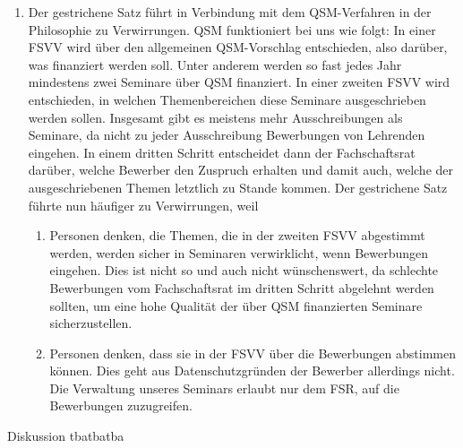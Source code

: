{\begin{enumerate}
\begin{enumerate}
                    \item Der gestrichene Satz führt in Verbindung mit dem QSM-Verfahren in der Philosophie zu Verwirrungen. QSM funktioniert bei uns wie folgt:
                    In einer FSVV wird über den allgemeinen QSM-Vorschlag entschieden, also darüber, was finanziert werden soll. Unter anderem werden so fast jedes Jahr mindestens zwei Seminare über QSM finanziert.
                    In einer zweiten FSVV wird entschieden, in welchen Themenbereichen diese Seminare ausgeschrieben werden sollen. Insgesamt gibt es meistens mehr Ausschreibungen als Seminare, da nicht zu jeder Ausschreibung Bewerbungen von Lehrenden eingehen.
                    In einem dritten Schritt entscheidet dann der Fachschaftsrat darüber, welche Bewerber den Zuspruch erhalten und damit auch, welche der ausgeschriebenen Themen letztlich zu Stande kommen.
                    Der gestrichene Satz führte nun häufiger zu Verwirrungen, weil 
                    \begin{enumerate}
                        \item Personen denken, die Themen, die in der zweiten FSVV abgestimmt werden, werden sicher in Seminaren verwirklicht, wenn Bewerbungen eingehen. Dies ist nicht so und auch nicht wünschenswert, da schlechte Bewerbungen vom Fachschaftsrat im dritten Schritt abgelehnt werden sollten, um eine hohe Qualität der über QSM finanzierten Seminare sicherzustellen.
                        \item Personen denken, dass sie in der FSVV über die Bewerbungen abstimmen können. Dies geht aus Datenschutzgründen der Bewerber allerdings nicht. Die Verwaltung unseres Seminars erlaubt nur dem FSR, auf die Bewerbungen zuzugreifen.
                    \end{enumerate}
                \end{enumerate} 
        \end{enumerate}
    }{
        Diskussion
    }{tba}{tba}{tba}
